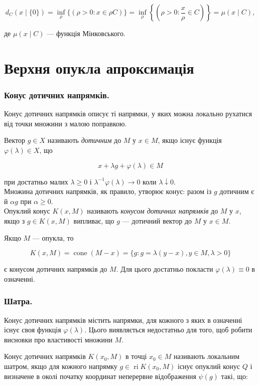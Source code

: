 \documentclass[12pt,a4paper]{extarticle}
\numberwithin{section}{part}
\begin{document}
$$
d_{C}(x \mid\{0\})=\inf _{\rho}\{(\rho>0: x \in \rho C)\}=\inf _{\rho}\left\{\left(\rho>0: \frac{x}{\rho} \in C\right)\right\}=\mu(x \mid C),
$$

де $\mu(x \mid C)$ --- функція Мінковського.


\part{Верхня опукла апроксимація}

\section{Конус дотичних напрямків.}
Конус дотичних напрямків описує ті напрямки, у яких можна локально рухатися від точки множини з малою поправкою.

Вектор $g \in X$ називають \textit{дотичним} до $M$ у $x \in M$, якщо існує функція $\varphi(\lambda) \in X$, що

$$
x+\lambda g+\varphi(\lambda) \in M
$$

при достатньо малих $\lambda \geq 0$ і $\lambda^{-1} \varphi(\lambda) \rightarrow 0$ коли $\lambda \downarrow 0$.\\
Множина дотичних напрямків, як правило, утворює конус: разом із $g$ дотичним є й $\alpha g$ при $\alpha \geq 0$.\\
Опуклий конус $K(x, M)$ називають \textit{конусом дотичних напрямків} до $M$ у $x$, якщо з $g \in K(x, M)$ випливає, що $g$ --- дотичний вектор до $M$ у $x \in M$.

Якщо $M$ --- опукла, то

$$
K(x, M)=\operatorname{cone}(M-x)=\{g: g=\lambda(y-x), y \in M, \lambda>0\}
$$

є конусом дотичних напрямків до $M$. Для цього достатньо покласти $\varphi(\lambda) \equiv 0$ в означенні.

\section{Шатра.}
Конус дотичних напрямків містить напрямки, для кожного з яких в означенні існує своя функція $\varphi(\lambda)$. Цього виявляється недостатньо для того, щоб робити висновки про властивості множини $M$.

Конус дотичних напрямків $K\left(x_{0}, M\right)$ в точці $x_{0} \in M$ називають локальним шатром, якщо для кожного напрямку $g \in \operatorname{ri} K\left(x_{0}, M\right)$ існує опуклий конус $Q$ і визначене в околі початку координат неперервне відображення $\psi(g)$ такі, що:
\end{document}
